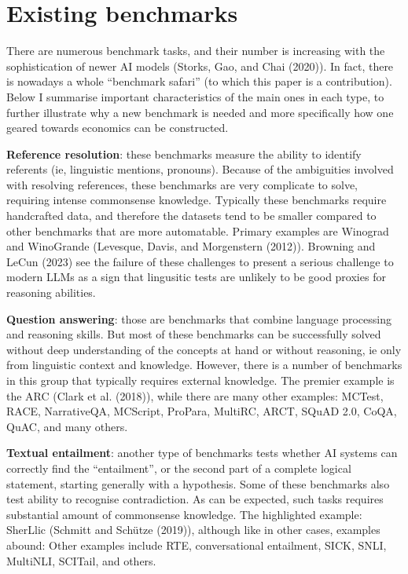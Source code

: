 \documentclass[
]{article}
\begin{document}
\section{Existing benchmarks}\label{sec-bench}

There are numerous benchmark tasks, and their number is increasing with
the sophistication of newer AI models (Storks, Gao, and Chai (2020)). In
fact, there is nowadays a whole ``benchmark safari'' (to which this
paper is a contribution). Below I summarise important characteristics of
the main ones in each type, to further illustrate why a new benchmark is
needed and more specifically how one geared towards economics can be
constructed.

\textbf{Reference resolution}: these benchmarks measure the ability to
identify referents (ie, linguistic mentions, pronouns). Because of the
ambiguities involved with resolving references, these benchmarks are
very complicate to solve, requiring intense commonsense knowledge.
Typically these benchmarks require handcrafted data, and therefore the
datasets tend to be smaller compared to other benchmarks that are more
automatable. Primary examples are Winograd and WinoGrande (Levesque,
Davis, and Morgenstern (2012)). Browning and LeCun (2023) see the
failure of these challenges to present a serious challenge to modern
LLMs as a sign that lingusitic tests are unlikely to be good proxies for
reasoning abilities.

\textbf{Question answering}: those are benchmarks that combine language
processing and reasoning skills. But most of these benchmarks can be
successfully solved without deep understanding of the concepts at hand
or without reasoning, ie only from linguistic context and knowledge.
However, there is a number of benchmarks in this group that typically
requires external knowledge. The premier example is the ARC (Clark et
al. (2018)), while there are many other examples: MCTest, RACE,
NarrativeQA, MCScript, ProPara, MultiRC, ARCT, SQuAD 2.0, CoQA, QuAC,
and many others.

\textbf{Textual entailment}: another type of benchmarks tests whether AI
systems can correctly find the ``entailment'', or the second part of a
complete logical statement, starting generally with a hypothesis. Some
of these benchmarks also test ability to recognise contradiction. As can
be expected, such tasks requires substantial amount of commonsense
knowledge. The highlighted example: SherLlic (Schmitt and Schütze
(2019)), although like in other cases, examples abound: Other examples
include RTE, conversational entailment, SICK, SNLI, MultiNLI, SCITail,
and others.
\end{document}
